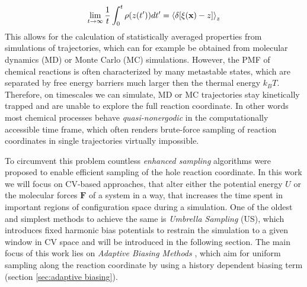 \begin{equation}
   \lim_{t\to\infty}\frac{1}{t} \int_0^t \rho(z(t')) dt' = \braket{\delta [\xi(\textbf{x})-z]}_z
  \label{eq:ergodic}
\end{equation}
This allows for the calculation of statistically averaged properties from simulations of trajectories, which can for example be obtained from molecular dynamics (MD) or Monte Carlo (MC) simulations.
However, the PMF of chemical reactions is often characterized by many metastable states, which are separated by free energy barriers much larger then the thermal energy $k_B T$.
Therefore, on timescales we can simulate, MD or MC trajectories stay kinetically trapped and are unable to explore the full reaction coordinate.
In other words most chemical processes behave \textit{quasi-nonergodic} in the computationally accessible time frame, which often renders brute-force sampling of reaction coordinates in single trajectories virtually impossible.

To circumvent this problem countless \textit{enhanced sampling} algorithms were proposed to enable efficient sampling of the hole reaction coordinate.\autocite{jiang2010free, sugita1999replica,den2000thermodynamic, kastner2011umbrella, ciccotti2005blue, barducci2008well}
In this work we will focus on CV-based approaches, that alter either the potential energy $U$ or the molecular forces $\textbf{F}$ of a system in a way, that increases the time spent in important regions of configuration space during a simulation.
One of the oldest and simplest methods to achieve the same is \textit{Umbrella Sampling} (US)\autocite{kastner2011umbrella}, which introduces fixed harmonic bias potentials to restrain the simulation to a given window in CV space and will be introduced in the following section.
The main focus of this work lies on \textit{Adaptive Biasing Methods} \autocite{barducci2011metadynamics,comer2015adaptive, lesage2017smoothed}, which aim for uniform sampling along the reaction coordinate by using a history dependent biasing term (section \ref{sec:adaptive biasing}).

